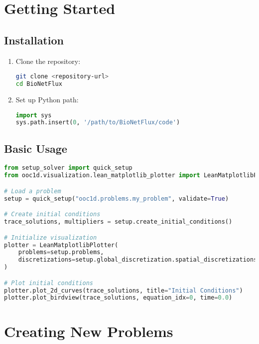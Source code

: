 \documentclass[11pt,a4paper]{article}
\begin{document}
\section{Getting Started}

\subsection{Installation}

\begin{enumerate}
    \item Clone the repository:
    \begin{lstlisting}[language=bash]
git clone <repository-url>
cd BioNetFlux
    \end{lstlisting}
    
    \item Set up Python path:
    \begin{lstlisting}[language=Python]
import sys
sys.path.insert(0, '/path/to/BioNetFlux/code')
    \end{lstlisting}
\end{enumerate}

\subsection{Basic Usage}

\begin{lstlisting}[language=Python, caption={Basic Usage Example}]
from setup_solver import quick_setup
from ooc1d.visualization.lean_matplotlib_plotter import LeanMatplotlibPlotter

# Load a problem
setup = quick_setup("ooc1d.problems.my_problem", validate=True)

# Create initial conditions
trace_solutions, multipliers = setup.create_initial_conditions()

# Initialize visualization
plotter = LeanMatplotlibPlotter(
    problems=setup.problems,
    discretizations=setup.global_discretization.spatial_discretizations
)

# Plot initial conditions
plotter.plot_2d_curves(trace_solutions, title="Initial Conditions")
plotter.plot_birdview(trace_solutions, equation_idx=0, time=0.0)
\end{lstlisting}

\section{Creating New Problems}
\end{document}
